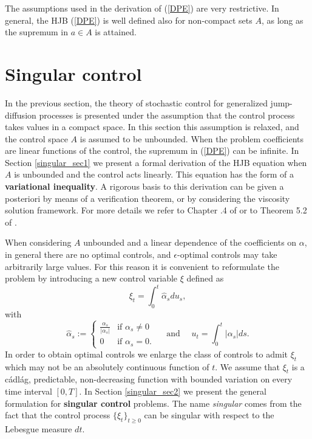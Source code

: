 \begin{Remark}
The assumptions used in the derivation of (\ref{DPE}) are very restrictive. 
In general, the HJB (\ref{DPE}) is well defined also for non-compact sets $A$, as long as the supremum in $a\in A$ is attained.
\end{Remark}





\section{Singular control}\label{singular_control}

In the previous section, the theory of stochastic control for generalized jump-diffusion processes is presented under the assumption that the control process 
takes values in a compact space.
In this section this assumption is relaxed, and the control space $A$ is assumed to be unbounded.
When the problem coefficients are linear functions of the control, the supremum in (\ref{DPE}) can be infinite. 
In Section \ref{singular_sec1}
we present a formal derivation of the HJB equation when $A$ is unbounded and the control acts linearly. This equation has the form of a \textbf{variational inequality}. 
A rigorous basis to this derivation can be given a posteriori by means of a verification theorem, or by considering the viscosity solution framework. 
For more details we refer to Chapter .4 of \cite{FlemingSoner} or to Theorem 5.2 of \cite{OksendalSulem}.

When considering $A$ unbounded and a linear dependence of the coefficients on $\alpha$, in general there are no optimal controls, and 
$\epsilon$-optimal controls may take arbitrarily large values.
For this reason it is convenient to reformulate the problem by introducing a new control variable $\xi$ defined as
\begin{equation}
 \xi_t = \int_0^t \hat \alpha_s du_s,
\end{equation}
with 
\begin{equation}
 \hat \alpha_s := \begin{cases} 
\frac{\alpha_s}{|\alpha_s|} & \mbox{if } \alpha_s \not= 0 \\ 
0 & \mbox{if } \alpha_s = 0 . 
\end{cases} 
\quad \mbox{ and } \quad
u_t = \int_0^t |\alpha_s| ds.
\end{equation}
In order to obtain optimal controls we enlarge the class of controls to admit $\xi_t$ which may not be an absolutely continuous function of $t$.
We assume that $\xi_t$ is a cádlág, predictable, non-decreasing function with bounded variation on every time interval $[0,T]$.
In Section \ref{singular_sec2} we present the general formulation for \textbf{singular control} problems.
The name \emph{singular} comes from the fact that the control process $\{\xi_t\}_{t \geq 0}$ can be singular with respect to the Lebesgue measure $dt$.


